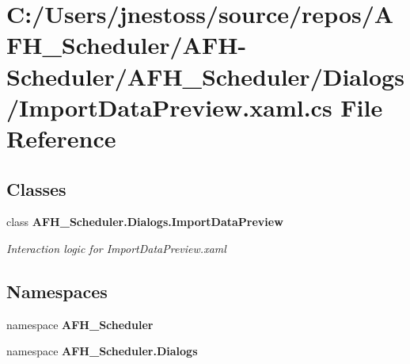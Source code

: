 \section{C\+:/\+Users/jnestoss/source/repos/\+A\+F\+H\+\_\+\+Scheduler/\+A\+F\+H-\/\+Scheduler/\+A\+F\+H\+\_\+\+Scheduler/\+Dialogs/\+Import\+Data\+Preview.xaml.\+cs File Reference}
\label{_import_data_preview_8xaml_8cs}
\subsection*{Classes}
\begin{DoxyCompactItemize}
\item 
class \textbf{ A\+F\+H\+\_\+\+Scheduler.\+Dialogs.\+Import\+Data\+Preview}
\begin{DoxyCompactList}\small\item\em Interaction logic for Import\+Data\+Preview.\+xaml \end{DoxyCompactList}\end{DoxyCompactItemize}
\subsection*{Namespaces}
\begin{DoxyCompactItemize}
\item 
namespace \textbf{ A\+F\+H\+\_\+\+Scheduler}
\item 
namespace \textbf{ A\+F\+H\+\_\+\+Scheduler.\+Dialogs}
\end{DoxyCompactItemize}
